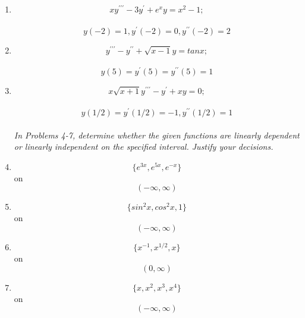 \documentclass{article}
\begin{document}
\begin{enumerate}
\item \begin{equation*}
    xy^{\prime\prime\prime} - 3y^{\prime} + e^xy = x^2 - 1;
    \end{equation*}\\
    \begin{equation*}
    y(-2) = 1, y^{\prime}(-2) = 0, y^{\prime\prime}(-2) = 2
\end{equation*}
\item\begin{equation*}
    y^{\prime\prime\prime} - y^{\prime\prime} + \sqrt{x-1}y = tan x;
\end{equation*}\\
\begin{equation*}
    y(5) = y^{\prime}(5) = y^{\prime\prime}(5) = 1
\end{equation*}
\item \begin{equation*}
    x\sqrt{x+1}y^{\prime\prime\prime} - y^{\prime} +xy = 0;
\end{equation*}\\
\begin{equation*}
    y(1/2) = y^{\prime}(1/2) = -1, y^{\prime\prime} (1/2) = 1
\end{equation*}\\

\textsl{In Problems 4-7, determine whether the given functions are linearly dependent or linearly independent on the specified interval. Justify your decisions.}

\item \begin{equation*}
    \{e^{3x}, e^{5x}, e^{-x}\} \end{equation*} on \begin{equation*} (-\infty, \infty) \end{equation*}
\item \begin{equation*}
   \{sin^2x, cos^2x, 1\} \end{equation*} on \begin{equation*} (-\infty, \infty) \end{equation*}
\item \begin{equation*}
    \{x^{-1}, x^{1/2}, x\} \end{equation*}  on \begin{equation*} (0, \infty) \end{equation*}
\item \begin{equation*}
    \{x, x^2, x^3, x^4\} \end{equation*} on \begin{equation*} (-\infty, \infty) \end{equation*}
\end{enumerate}
\end{document}
